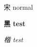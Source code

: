 \documentclass[UTF8, nofonts]{ctexart}
\begin{document}
宋 normal

\textbf{黑 test}

\textit{楷 test}
\end{document}
